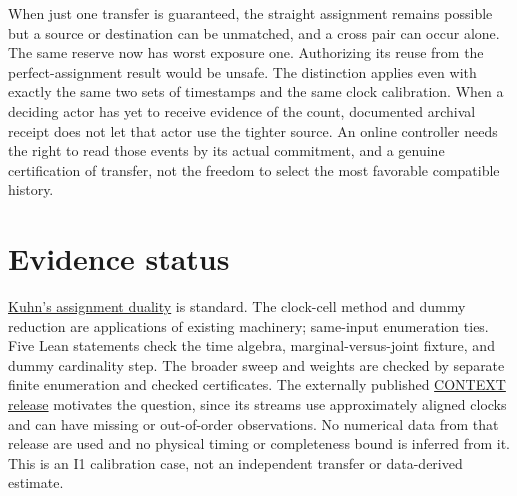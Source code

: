 \documentclass[11pt]{article}
\begin{document}
When just one transfer is guaranteed, the straight
assignment remains possible but a source or destination can
be unmatched, and a cross pair can occur alone. The same
reserve now has worst exposure one. Authorizing its reuse
from the perfect-assignment result would be unsafe.
The distinction applies even with exactly the same two
sets of timestamps and the same clock calibration.
When a deciding actor has yet to receive evidence of the
count, documented archival receipt does not let that actor
use the tighter source. An online controller needs the
right to read those events by its actual commitment,
and a genuine certification of transfer, not the freedom
to select the most favorable compatible history.

\section{Evidence status}
\href{https://ftp.eecs.umich.edu/~pettie/matching/Kuhn-hungarian-assignment.pdf}{Kuhn's
assignment duality} is standard. The clock-cell method and
dummy reduction are applications of existing machinery;
same-input enumeration ties. Five Lean statements check the
time algebra, marginal-versus-joint fixture, and dummy
cardinality step. The broader sweep and weights are checked
by separate finite enumeration and checked certificates.
The externally published \href{https://zenodo.org/records/4034867}{CONTEXT
release} motivates the question, since its streams use
approximately aligned clocks and can have missing or
out-of-order observations. No numerical data from that
release are used and no physical timing or completeness
bound is inferred from it. This is an I1 calibration
case, not an independent transfer or data-derived estimate.
\end{document}
